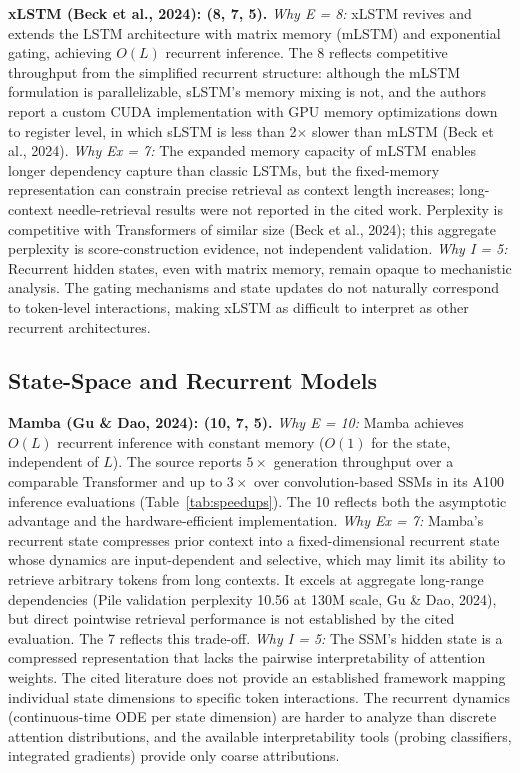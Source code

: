 \documentclass[10pt,twocolumn]{article}
\begin{document}
\textbf{xLSTM (Beck et al., 2024): (8, 7, 5).}
\textit{Why E = 8:} xLSTM revives and extends the LSTM architecture with matrix memory (mLSTM) and exponential gating, achieving $O(L)$ recurrent inference. The 8 reflects competitive throughput from the simplified recurrent structure: although the mLSTM formulation is parallelizable, sLSTM's memory mixing is not, and the authors report a custom CUDA implementation with GPU memory optimizations down to register level, in which sLSTM is less than 2$\times$ slower than mLSTM (Beck et al., 2024). \textit{Why Ex = 7:} The expanded memory capacity of mLSTM enables longer dependency capture than classic LSTMs, but the fixed-memory representation can constrain precise retrieval as context length increases; long-context needle-retrieval results were not reported in the cited work. Perplexity is competitive with Transformers of similar size (Beck et al., 2024); this aggregate perplexity is score-construction evidence, not independent validation. \textit{Why I = 5:} Recurrent hidden states, even with matrix memory, remain opaque to mechanistic analysis. The gating mechanisms and state updates do not naturally correspond to token-level interactions, making xLSTM as difficult to interpret as other recurrent architectures.

\subsection*{State-Space and Recurrent Models}

\textbf{Mamba (Gu \& Dao, 2024): (10, 7, 5).}
\textit{Why E = 10:} Mamba achieves $O(L)$ recurrent inference with constant memory ($O(1)$ for the state, independent of $L$). The source reports $5\times$ generation throughput over a comparable Transformer and up to $3\times$ over convolution-based SSMs in its A100 inference evaluations (Table~\ref{tab:speedups}). The 10 reflects both the asymptotic advantage and the hardware-efficient implementation. \textit{Why Ex = 7:} Mamba's recurrent state compresses prior context into a fixed-dimensional recurrent state whose dynamics are input-dependent and selective, which may limit its ability to retrieve arbitrary tokens from long contexts. It excels at aggregate long-range dependencies (Pile validation perplexity 10.56 at 130M scale, Gu \& Dao, 2024), but direct pointwise retrieval performance is not established by the cited evaluation. The 7 reflects this trade-off. \textit{Why I = 5:} The SSM's hidden state is a compressed representation that lacks the pairwise interpretability of attention weights. The cited literature does not provide an established framework mapping individual state dimensions to specific token interactions. The recurrent dynamics (continuous-time ODE per state dimension) are harder to analyze than discrete attention distributions, and the available interpretability tools (probing classifiers, integrated gradients) provide only coarse attributions.
\end{document}

